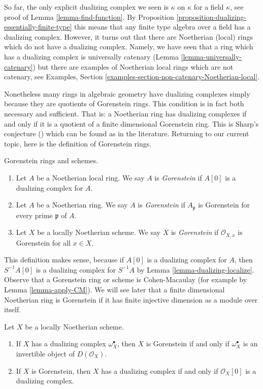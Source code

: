 \noindent
So far, the only explicit dualizing complex we seen is $\kappa$ on $\kappa$
for a field $\kappa$, see proof of Lemma \ref{lemma-find-function}.
By Proposition \ref{proposition-dualizing-essentially-finite-type}
this means that any finite type algebra over a field has a dualizing
complex. However, it turns out that there are Noetherian (local) rings
which do not have a dualizing complex. Namely, we have seen that
a ring which has a dualizing complex is universally catenary
(Lemma \ref{lemma-universally-catenary}) but there are examples of
Noetherian local rings which are not catenary, see
Examples, Section \ref{examples-section-non-catenary-Noetherian-local}.

\medskip\noindent
Nonetheless many rings in algebraic geometry have dualizing complexes
simply because they are quotients of Gorenstein rings. This condition
is in fact both necessary and sufficient. That is: a Noetherian ring
has dualizing complexes if and only if it is a quotient of a finite
dimensional Gorenstein ring. This is Sharp's conjecture (\cite{Sharp})
which can be found as \cite[Corollary 1.4]{Kawasaki} in the literature.
Returning to our current topic, here is the definition of Gorenstein rings.

\begin{definition}
\label{definition-gorenstein}
Gorenstein rings and schemes.
\begin{enumerate}
\item Let $A$ be a Noetherian local ring. We say $A$ is {\it Gorenstein}
if $A[0]$ is a dualizing complex for $A$.
\item Let $A$ be a Noetherian ring. We say $A$ is {\it Gorenstein}
if $A_\mathfrak p$ is Gorenstein for every prime $\mathfrak p$ of $A$.
\item Let $X$ be a locally Noetherian scheme. We say $X$ is {\it Gorenstein}
if $\mathcal{O}_{X, x}$ is Gorenstein for all $x \in X$.
\end{enumerate}
\end{definition}

\noindent
This definition makes sense, because if $A[0]$ is a dualizing complex
for $A$, then $S^{-1}A[0]$ is a dualizing complex for $S^{-1}A$ by
Lemma \ref{lemma-dualizing-localize}.
Observe that a Gorenstein ring or scheme is Cohen-Macaulay
(for example by Lemma \ref{lemma-apply-CM}).
We will see later that a finite dimensional Noetherian ring is Gorenstein
if it has finite injective dimension as a module over itself.

\begin{lemma}
\label{lemma-gorenstein}
Let $X$ be a locally Noetherian scheme.
\begin{enumerate}
\item If $X$ has a dualizing complex $\omega_X^\bullet$, then
$X$ is Gorenstein if and only if $\omega_X^\bullet$ is an invertible
object of $D(\mathcal{O}_X)$.
\item If $X$ is Gorenstein, then $X$ has a dualizing complex if and
only if $\mathcal{O}_X[0]$ is a dualizing complex.
\end{enumerate}
\end{lemma}

